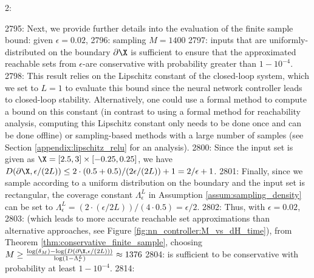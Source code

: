 2: \documentclass[12pt]{l4dc2022} %
\begin{document}
2795: Next, we provide further details into the evaluation of the finite sample bound: given $\epsilon=0.02$, %
2796: sampling $M=1400$ %
2797: inputs that are uniformly-distributed on the boundary $\partial\X$ is sufficient to ensure that the approximated reachable sets from $\epsilon$-\randup are conservative with probability greater than $1-10^{-4}$. 
2798: This result relies on the Lipschitz constant of the closed-loop system, which we set to $L=1$ to evaluate this bound since the neural network controller leads to closed-loop stability. Alternatively, one could use a formal method to compute a bound on this constant (in contrast to using a formal method for reachability analysis, computing this Lipschitz constant only needs to be done once and can be done offline) or sampling-based methods with a large number of samples (see Section \ref{appendix:lipschitz_relu} for an analysis). 
2800: Since the input set is given as $\X=[2.5,3]\times[-0.25,0.25]$, we have $D(\partial\X, \epsilon/(2L))\leq 2\cdot(0.5+0.5)/(2\epsilon/(2L)) + 1=2/\epsilon+1$. 
2801: Finally, since we sample according to a uniform distribution on the boundary and the input set is rectangular, the coverage constant $\Lambda_\epsilon^L$ in Assumption \ref{assum:sampling_density} can be set to $\Lambda_\epsilon^L=(2\cdot(\epsilon/2L)) / (4\cdot0.5)=\epsilon/2$. 
2802: Thus, with $\epsilon=0.02$, %
2803: (which leads to more accurate reachable set approximations than alternative approaches, see Figure \ref{fig:nn_controller:M_vs_dH_time}), from Theorem \ref{thm:conservative_finite_sample}, choosing $M\geq \frac{\log(\delta_M)-\log(D(\partial\X,\epsilon/(2L)))}{\log(1-\Lambda_\epsilon^L)}\approx 1376$ %
2804: is sufficient to be conservative with probability at least $1-10^{-4}$.
2814: 
\end{document}
